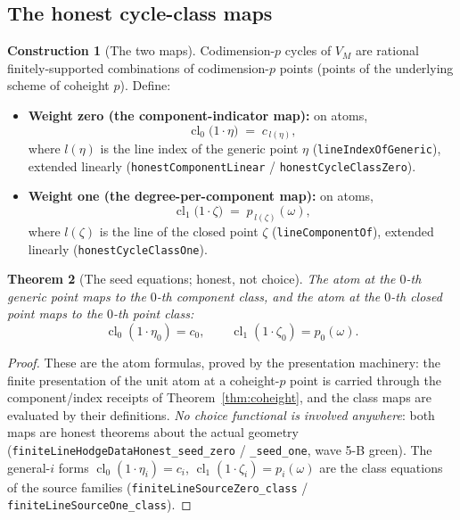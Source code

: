 \documentclass[11pt,a4paper]{article}
\theoremstyle{plain}
\newtheorem{theorem}{Theorem}[section]
\theoremstyle{definition}
\newtheorem{construction}[theorem]{Construction}
\newcommand{\cl}{\operatorname{cl}}
\begin{document}
\subsection{The honest cycle-class maps}

\begin{construction}[The two maps]\label{con:cycle-class}
Codimension-$p$ cycles of $V_M$ are rational finitely-supported
combinations of codimension-$p$ points (points of the underlying
scheme of coheight $p$).  Define:
\begin{itemize}
\item \textbf{Weight zero (the component-indicator map):} on atoms,
\[
\cl_0\bigl( 1 \cdot \eta \bigr) \;=\; c_{\,l(\eta)},
\]
where $l(\eta)$ is the line index of the generic point $\eta$
(\texttt{lineIndexOfGeneric}), extended linearly
(\texttt{honestComponentLinear} / \texttt{honestCycleClassZero}).
\item \textbf{Weight one (the degree-per-component map):} on atoms,
\[
\cl_1\bigl( 1 \cdot \zeta \bigr) \;=\; p_{\,l(\zeta)}(\omega),
\]
where $l(\zeta)$ is the line of the closed point $\zeta$
(\texttt{lineComponentOf}), extended linearly
(\texttt{honestCycleClassOne}).
\end{itemize}
\end{construction}

\begin{theorem}[The seed equations; honest, not choice]
\label{thm:seeds}
The atom at the $0$-th generic point maps to the $0$-th component
class, and the atom at the $0$-th closed point maps to the $0$-th
point class:
\[
\cl_0(1 \cdot \eta_0) = c_0, \qquad \cl_1(1 \cdot \zeta_0) =
p_0(\omega).
\]
\end{theorem}

\begin{proof}
These are the atom formulas, proved by the presentation machinery:
the finite presentation of the unit atom at a coheight-$p$ point is
carried through the component/index receipts of
Theorem~\ref{thm:coheight}, and the class maps are evaluated by their
definitions.  \emph{No choice functional is involved anywhere}: both
maps are honest theorems about the actual geometry
(\texttt{finiteLineHodgeDataHonest\_seed\_zero} / \verb|_seed_one|,
wave 5-B green).  The general-$i$ forms
$\cl_0(1\cdot\eta_i) = c_i$, $\cl_1(1\cdot\zeta_i) = p_i(\omega)$ are
the class equations of the source families
(\texttt{finiteLineSourceZero\_class} / \texttt{finiteLineSourceOne\_class}).
\end{proof}
\end{document}
